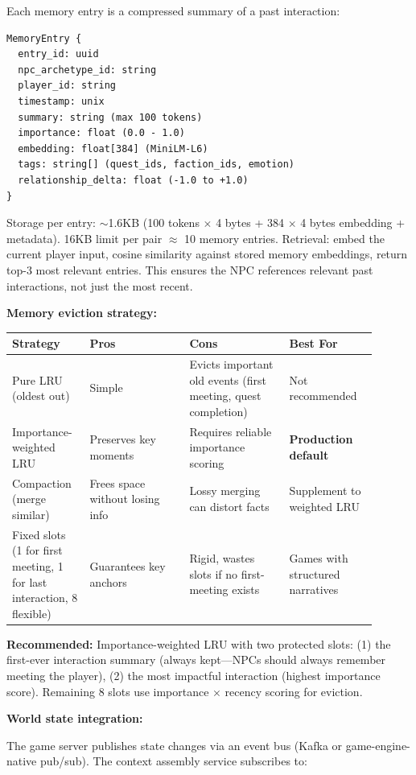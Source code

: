 Each memory entry is a compressed summary of a past interaction:

\begin{verbatim}
MemoryEntry {
  entry_id: uuid
  npc_archetype_id: string
  player_id: string
  timestamp: unix
  summary: string (max 100 tokens)
  importance: float (0.0 - 1.0)
  embedding: float[384] (MiniLM-L6)
  tags: string[] (quest_ids, faction_ids, emotion)
  relationship_delta: float (-1.0 to +1.0)
}
\end{verbatim}

Storage per entry: $\sim$1.6KB (100 tokens $\times$ 4 bytes + 384 $\times$ 4 bytes embedding + metadata). 16KB limit per pair $\approx$ 10 memory entries. Retrieval: embed the current player input, cosine similarity against stored memory embeddings, return top-3 most relevant entries. This ensures the NPC references relevant past interactions, not just the most recent.

\textbf{Memory eviction strategy:}

\begin{tabular}{|p{0.18\linewidth}|p{0.25\linewidth}|p{0.25\linewidth}|p{0.22\linewidth}|}
\hline
\textbf{Strategy} & \textbf{Pros} & \textbf{Cons} & \textbf{Best For} \\
\hline
Pure LRU (oldest out) & Simple & Evicts important old events (first meeting, quest completion) & Not recommended \\
\hline
Importance-weighted LRU & Preserves key moments & Requires reliable importance scoring & \textbf{Production default} \\
\hline
Compaction (merge similar) & Frees space without losing info & Lossy merging can distort facts & Supplement to weighted LRU \\
\hline
Fixed slots (1 for first meeting, 1 for last interaction, 8 flexible) & Guarantees key anchors & Rigid, wastes slots if no first-meeting exists & Games with structured narratives \\
\hline
\end{tabular}

\bigskip
\textbf{Recommended:} Importance-weighted LRU with two protected slots: (1) the first-ever interaction summary (always kept---NPCs should always remember meeting the player), (2) the most impactful interaction (highest importance score). Remaining 8 slots use importance $\times$ recency scoring for eviction.

\textbf{World state integration:}

The game server publishes state changes via an event bus (Kafka or game-engine-native pub/sub). The context assembly service subscribes to:


